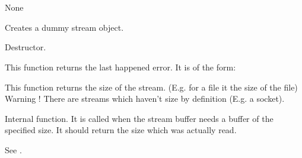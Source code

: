 \section{}\label{wxstreambase}


None






Creates a dummy stream object.


Destructor.


This function returns the last happened error. It is of the form:


This function returns the size of the stream. (E.g. for a file it the size of
the file) Warning ! There are streams which haven't size by definition (E.g.
a socket).

\label{wxstreambaseonsysread}

Internal function. It is called when the stream buffer needs a buffer of the
specified size. It should return the size which was actually read.


See .


